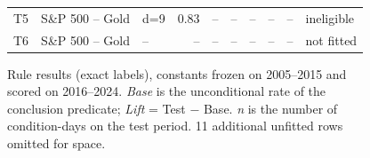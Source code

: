 \begin{figure}[t]
{\begin{tabular}{lllrrrrrrl}
T5 & S\&P 500 -- Gold & d=9 & 0.83 & -- & -- & -- & -- & -- & ineligible \\
T6 & S\&P 500 -- Gold & -- & -- & -- & -- & -- & -- & -- & not fitted \\
\bottomrule
\end{tabular}
}
\caption{Rule results (exact labels), constants frozen on 2005--2015 and scored on 2016--2024. \emph{Base} is the unconditional rate of the conclusion predicate; \emph{Lift} = Test $-$ Base. \emph{n} is the number of condition-days on the test period. 11 additional unfitted rows omitted for space.}
\label{tab:rule-results-pub}
\end{figure}
